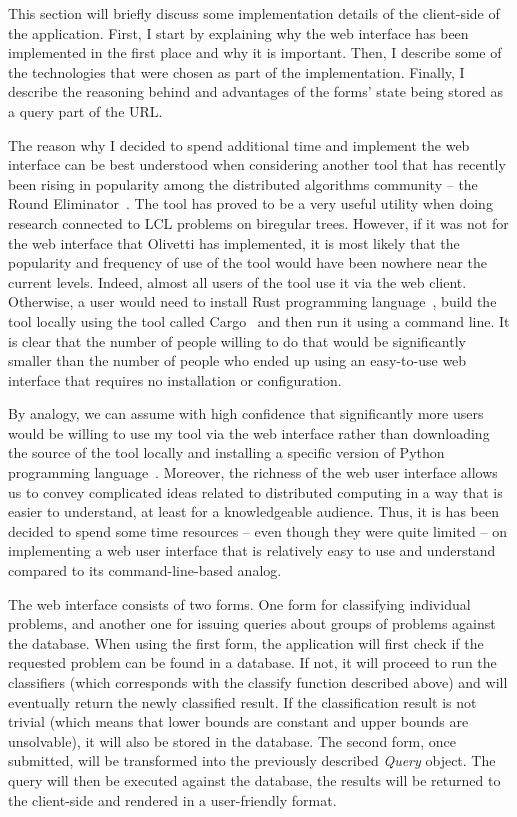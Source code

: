 This section will briefly discuss some implementation details of
the client-side of the application. First, I start by explaining why
the web interface has been implemented in the first place and why it
is important. Then, I describe some of the technologies that were
chosen as part of the implementation. Finally, I describe the
reasoning behind and advantages of the forms' state being stored
as a query part of the URL.

The reason why I decided to spend additional time and implement
the web interface can be best understood when considering
another tool that has recently been rising in popularity among
the distributed algorithms community -- the Round Eliminator~\cite{Olivetti2020}. The tool has proved to be a very useful utility
when doing research connected to LCL problems on biregular trees.
However, if it was not for the web interface that Olivetti has
implemented, it is most likely that the popularity and
frequency of use of the tool would have been nowhere near the current
levels. Indeed, almost all users of the tool use it via the web
client. Otherwise, a user would need to install Rust programming
language~\cite{Rust}, build the tool locally using the tool
called Cargo~\cite{Cargo} and then run it using a command line.
It is clear that the number of people willing to do that would be
significantly smaller than the number of people who ended up using
an easy-to-use web interface that requires no installation or 
configuration.

By analogy, we can assume with high confidence that significantly more
users would be willing to use my tool via the web interface rather
than downloading the source of the tool locally and installing
a specific version of Python programming language~\cite{CPython}.
Moreover, the richness of the web user interface allows us to convey complicated
ideas related to distributed computing in a way that is easier to understand, at least for a knowledgeable audience. Thus, it is has been
decided to spend some time resources -- even though they were 
quite limited -- on implementing a web user interface that is
relatively easy to use and understand compared to its
command-line-based analog.

The web interface consists of two forms. One form for classifying
individual problems, and another one for issuing queries
about groups of problems against the database. When using the
first form, the application will first check if the requested
problem can be found in a database. If not, it will proceed to
run the classifiers (which corresponds with the classify function described above) and will eventually return the newly
classified result. If the classification result is not trivial (which means that lower bounds are constant and upper bounds are unsolvable),
it will also be stored in the database. The second form, once
submitted, will be transformed into the previously described
\emph{Query} object. The query will then be executed against the database,
the results will be returned to the client-side and rendered
in a user-friendly format.

